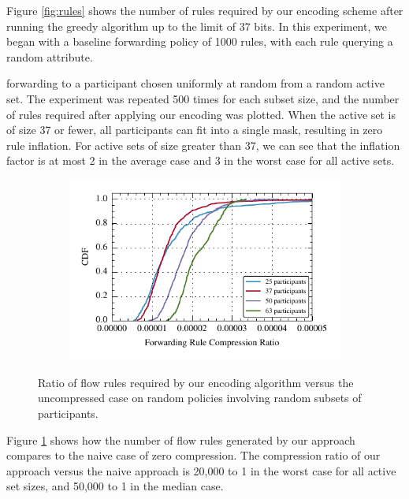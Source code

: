 Figure \ref{fig:rules} shows the number of rules required by our encoding scheme after running the greedy algorithm up to the limit of 37 bits. In this experiment, we began with a baseline forwarding policy of 1000 rules, with each rule querying a random attribute.

forwarding to a participant chosen uniformly at random from a random active set. The experiment was repeated 500 times for each subset size, and the number of rules required after applying our encoding was plotted. When the active set is of size 37 or fewer, all participants can fit into a single mask, resulting in zero rule inflation. For active sets of size greater than 37, we can see that the inflation factor is at most 2 in the average case and 3 in the worst case for all active sets. 


\begin{figure}[t!] 
\begin{minipage}{1\linewidth}
\begin{subfigure}[b]{0.96\linewidth}
\includegraphics[width=\linewidth]{figures/compression_cdf}
\end{subfigure} 
\end{minipage} 
\caption{Ratio of flow rules required by our encoding algorithm versus the uncompressed
case on random policies involving random subsets of participants.}
\label{fig:compression}
\end{figure}

Figure \ref{fig:compression} shows how the number of flow rules generated by our approach compares to the naive case of zero compression. The compression ratio of our approach versus the naive approach is 20,000 to 1 in the worst case for all active set sizes, and 50,000 to 1 in the median case.


